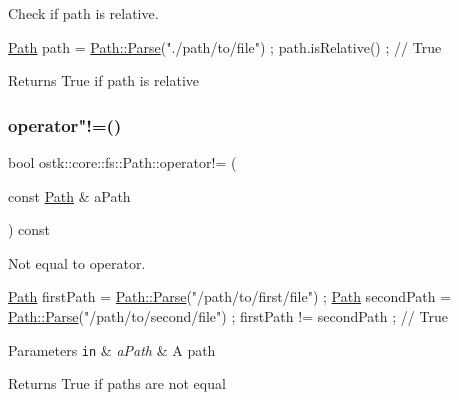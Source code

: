 Check if path is relative. 


\begin{DoxyCode}
\hyperlink{classostk_1_1core_1_1fs_1_1_path_a1a5fff28594542489223b4cfad6cc9fb}{Path} path = \hyperlink{classostk_1_1core_1_1fs_1_1_path_ad08539ba654f5df11c4bcb07276345ad}{Path::Parse}(\textcolor{stringliteral}{"./path/to/file"}) ;
path.isRelative() ; \textcolor{comment}{// True}
\end{DoxyCode}


\begin{DoxyReturn}{Returns}
True if path is relative 
\end{DoxyReturn}
\mbox{\label{classostk_1_1core_1_1fs_1_1_path_a9188fa1857fd43acb8409d6851564b47}} 
\subsubsection{\texorpdfstring{operator"!=()}{operator!=()}}
{\footnotesize\ttfamily bool ostk\+::core\+::fs\+::\+Path\+::operator!= (\begin{DoxyParamCaption}\item[{const \hyperlink{classostk_1_1core_1_1fs_1_1_path}{Path} \&}]{a\+Path }\end{DoxyParamCaption}) const}



Not equal to operator. 


\begin{DoxyCode}
\hyperlink{classostk_1_1core_1_1fs_1_1_path_a1a5fff28594542489223b4cfad6cc9fb}{Path} firstPath = \hyperlink{classostk_1_1core_1_1fs_1_1_path_ad08539ba654f5df11c4bcb07276345ad}{Path::Parse}(\textcolor{stringliteral}{"/path/to/first/file"}) ;
\hyperlink{classostk_1_1core_1_1fs_1_1_path_a1a5fff28594542489223b4cfad6cc9fb}{Path} secondPath = \hyperlink{classostk_1_1core_1_1fs_1_1_path_ad08539ba654f5df11c4bcb07276345ad}{Path::Parse}(\textcolor{stringliteral}{"/path/to/second/file"}) ;
firstPath != secondPath ; \textcolor{comment}{// True}
\end{DoxyCode}



\begin{DoxyParams}[1]{Parameters}
\mbox{\tt in}  & {\em a\+Path} & A path \\
\hline
\end{DoxyParams}
\begin{DoxyReturn}{Returns}
True if paths are not equal 
\end{DoxyReturn}
\mbox{\label{classostk_1_1core_1_1fs_1_1_path_a0f2659ad453d0648b1a0888e90a0a9ed}} 
